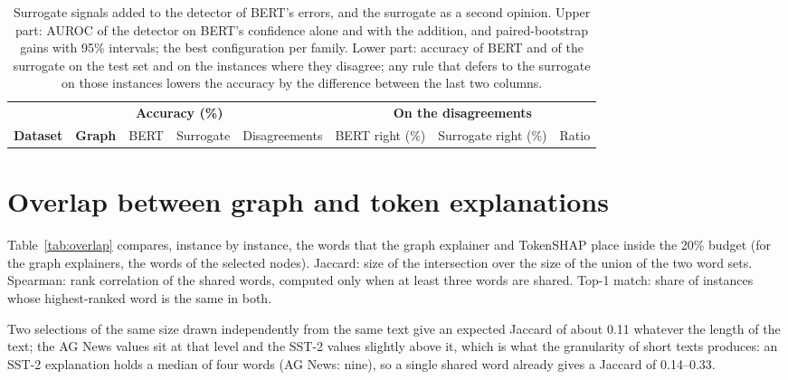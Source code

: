 \documentclass[3p,times,10pt,nopreprintline]{elsarticle}
\begin{document}
\begin{table}[H]
\centering
\scriptsize
\setlength{\tabcolsep}{4pt}
\caption{Surrogate signals added to the detector of BERT's errors, and the surrogate as a second opinion. Upper part: AUROC of the detector on BERT's confidence alone and with the addition, and paired-bootstrap gains with 95\% intervals; the best configuration per family. Lower part: accuracy of BERT and of the surrogate on the test set and on the instances where they disagree; any rule that defers to the surrogate on those instances lowers the accuracy by the difference between the last two columns.}
\label{tab:cross_model}

\vspace{0.8em}
\begin{tabular}{@{}llcccccc@{}}
\toprule
& & \multicolumn{2}{c}{\textbf{Accuracy (\%)}} & & \multicolumn{3}{c}{\textbf{On the disagreements}} \\
\cmidrule(lr){3-4} \cmidrule(lr){6-8}
\textbf{Dataset} & \textbf{Graph} & BERT & Surrogate & Disagreements & BERT right (\%) & Surrogate right (\%) & Ratio \\
\midrule

\end{tabular}
\end{table}

\section{Overlap between graph and token explanations}

Table~\ref{tab:overlap} compares, instance by instance, the words that the graph explainer and TokenSHAP place inside the 20\% budget (for the graph explainers, the words of the selected nodes). Jaccard: size of the intersection over the size of the union of the two word sets. Spearman: rank correlation of the shared words, computed only when at least three words are shared. Top-1 match: share of instances whose highest-ranked word is the same in both.

Two selections of the same size drawn independently from the same text give an expected Jaccard of about 0.11 whatever the length of the text; the AG News values sit at that level and the SST-2 values slightly above it, which is what the granularity of short texts produces: an SST-2 explanation holds a median of four words (AG News: nine), so a single shared word already gives a Jaccard of 0.14--0.33.
\end{document}

